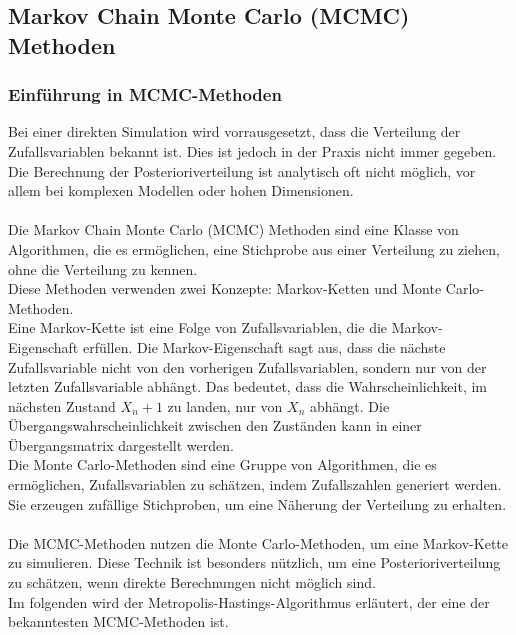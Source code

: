 \documentclass[a4paper,12pt]{article}
\begin{document}
\subsection{Markov Chain Monte Carlo (MCMC) Methoden}
\subsubsection{Einführung in MCMC-Methoden}
Bei einer direkten Simulation wird vorrausgesetzt, dass die Verteilung der Zufallsvariablen bekannt ist.
Dies ist jedoch in der Praxis nicht immer gegeben.
Die Berechnung der Posterioriverteilung ist analytisch oft nicht möglich, vor allem bei komplexen Modellen oder hohen Dimensionen. \\\\
Die Markov Chain Monte Carlo (MCMC) Methoden sind eine Klasse von Algorithmen, die es ermöglichen, eine Stichprobe aus einer Verteilung zu ziehen, ohne die Verteilung zu kennen. \parencite[179]{MonteCarloAlgorithmen} \\
Diese Methoden verwenden zwei Konzepte: Markov-Ketten und Monte Carlo-Methoden. \\
Eine Markov-Kette ist eine Folge von Zufallsvariablen, die die Markov-Eigenschaft erfüllen. 
Die Markov-Eigenschaft sagt aus, dass die nächste Zufallsvariable nicht von den vorherigen Zufallsvariablen, sondern nur von der letzten Zufallsvariable abhängt. 
Das bedeutet, dass die Wahrscheinlichkeit, im nächsten Zustand $X_n+1$ zu landen, nur von $X_n$ abhängt. 
Die Übergangswahrscheinlichkeit zwischen den Zuständen kann in einer Übergangsmatrix dargestellt werden. \parencite[188f.]{MonteCarloAlgorithmen} \\
Die Monte Carlo-Methoden sind eine Gruppe von Algorithmen, die es ermöglichen, Zufallsvariablen zu schätzen, indem Zufallszahlen generiert werden. 
Sie erzeugen zufällige Stichproben, um eine Näherung der Verteilung zu erhalten. \parencite[14f.]{MonteCarloAlgorithmen} \\\\
Die MCMC-Methoden nutzen die Monte Carlo-Methoden, um eine Markov-Kette zu simulieren. Diese Technik ist besonders nützlich, um eine Posterioriverteilung zu schätzen, wenn direkte Berechnungen nicht möglich sind. \parencite[179]{MonteCarloAlgorithmen} \\
Im folgenden wird der Metropolis-Hastings-Algorithmus erläutert, der eine der bekanntesten MCMC-Methoden ist.
\newpage
\end{document}

